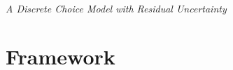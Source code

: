\documentclass{article}
\begin{document}
{\centering \LARGE \textit{A Discrete Choice Model with Residual Uncertainty}\par}

\section{Framework}

\begin{comment}
\section{Framework Setup}

Consumers are indexed by $i=1,2,\ldots\,I$. Goods are indexed by $j=1,2,\ldots\,J$ and each good is characterized by a vector of characteristics $x_j$. Each consumer has: (i) taste parameters $\beta_i$, (ii) a good-specific taste shock $\varepsilon_{ij}$, and (iii) a good-specific taste shock $\nu_{ij}$. The outside good is indexed with $j=0$ and $x_j = \mathbf{0}$.        
Consumer $i$ derives utility $U_{ij}$ from good $j$, where
\begin{equation}
    U_{ij} = \exp\left\lbrace {x_j}' \beta_{i} + \nu_{ij} + \varepsilon_{ij} \right\rbrace.
\end{equation}
For each consumer $i$, the econometrician observes:
\begin{itemize}
    \item The most preferred good $j \in \left\lbrace 1, 2, \ldots\,J\right\rbrace$, denoted $j_i^{(1)}$. Let $t_i = e_{j^{(1)}}$ represent the ``one-hot'' encoding of consumer $i$'s choice of good $j^{(1)}$;
    \item A signal related to the probability that the consumer prefers the outside good $j=0$. This signal takes the form of an ordinal scale $w\in{}\left\lbrace1,2,\ldots\,W\right\rbrace$. Higher $w_i$ corresponds to increased probability of choosing $j_i^{(1)}$ over the outside good 0.
\end{itemize}
In addition, the econometrician observes the matrix of good characteristics $\symbfit{x}$.

\section{Special Case of the Log Likelihood}


\end{comment}
\end{document}
